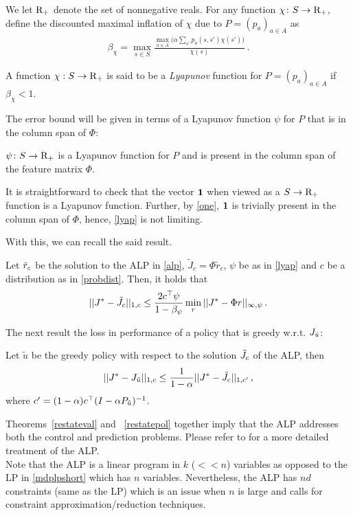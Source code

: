 We let $\mathrm{R}_+$ denote the set of nonnegative reals. 
For any function $\chi\colon S\rightarrow \mathrm{R}_+$, define the discounted maximal inflation of $\chi$ due to $P = (p_a)_{a\in A}$ as
\begin{align*}
\beta_{\chi}=\max_{s \in S} \frac{\underset{a \in A}{\max}\big(\alpha\sum_{s'}p_a(s,s')\chi(s')\big)}{\chi(s)}\,.
\end{align*}
\begin{definition}
A function $\chi:S\to\mathrm{R}_+$ is said to be a \emph{Lyapunov} function for $P = (p_a)_{a\in A}$ 
	if $\beta_{\chi}<1$.
\end{definition}
The error bound will be given in terms of a Lyapunov function $\psi$ for $P$ that is in the column span of $\Phi$:
\begin{assumption}\label{lyap}
$\psi\colon S \rightarrow \mathrm{R}_+$ is a Lyapunov function for $P$
and is present in the column span of the feature matrix $\Phi$.
\end{assumption}
It is straightforward to check that the vector $\mathbf{1}$ when viewed as a $S \to \mathrm{R}_+$ function 
is a Lyapunov function. 
Further, by \cref{one}, $\mathbf{1}$ is trivially present in the column span of $\Phi$, 
hence, \cref{lyap} is not limiting.

With this, we can recall the said result.  %
\begin{theorem}
\label{restateval}
Let $\tilde{r}_c$ be the solution to the ALP in \eqref{alp}, $\tilde{J}_c=\Phi \tilde{r}_c$, $\psi$ be as in \cref{lyap} 
and $c$ be a distribution as in \eqref{probdist}. Then, it holds that
\begin{align*}
||J^*-\tilde{J}_c||_{1,c}\leq \frac{2c^\top \psi}{1-\beta_{\psi}}\min_{r}||J^*-\Phi r||_{\infty,\psi}\,.
\end{align*}
\end{theorem}
The next result  the loss in performance of a policy that is greedy w.r.t. $J_{\tilde{u}}$:
\begin{theorem}
\label{restatepol}
Let $\tilde{u}$ be the greedy policy with respect to the solution $\tilde{J}_c$ of the ALP, then 
\begin{align*}
||J^*-J_{\tilde{u}}||_{1,c}\leq \frac{1}{1-\alpha}||J^*-\tilde{J}_c||_{1,c'}\,,
\end{align*}
where $c'=(1-\alpha)c^\top(I-\alpha P_{\tilde{u}})^{-1}$.
\end{theorem}
Theorems~\ref{restateval} and ~\ref{restatepol} together imply that the ALP addresses both the control and prediction problems. Please refer to \cite{ALP} for a more detailed treatment of the ALP.\\
Note that the ALP is a linear program in $k$ ($<<n$) variables as opposed to the LP in \eqref{mdplpshort} which has $n$ variables. Nevertheless, the ALP has $nd$ constraints (same as the LP) which is an issue when $n$ is large and calls for constraint approximation/reduction techniques.
